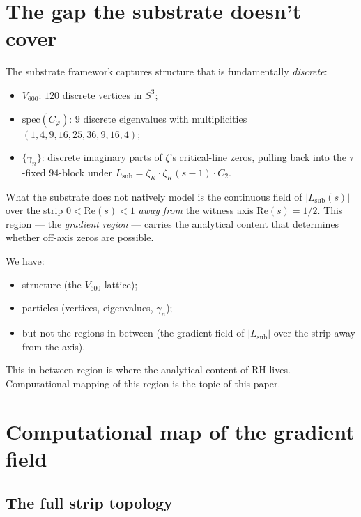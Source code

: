 \documentclass[11pt,a4paper]{article}
\newcommand{\Vsix}{V_{600}}
\newcommand{\Cphi}{C_\varphi}
\newcommand{\Lsub}{L_{\mathrm{sub}}}
\begin{document}
\tableofcontents
\newpage

\section{The gap the substrate doesn't cover}
\label{sec:gap}

The substrate framework captures structure that is fundamentally
\emph{discrete}:

\begin{itemize}[leftmargin=*]
  \item $\Vsix$: $120$ discrete vertices in $S^3$;
  \item $\mathrm{spec}(\Cphi)$: $9$ discrete eigenvalues with
        multiplicities $(1, 4, 9, 16, 25, 36, 9, 16, 4)$;
  \item $\{\gamma_n\}$: discrete imaginary parts of $\zeta$'s
        critical-line zeros, pulling back into the $\tau$-fixed
        $94$-block under $\Lsub = \zeta_K \cdot \zeta_K(s-1)
        \cdot C_2$.
\end{itemize}

What the substrate does not natively model is the continuous
field of $|\Lsub(s)|$ over the strip $0 < \mathrm{Re}(s) < 1$
\emph{away from} the witness axis $\mathrm{Re}(s) = 1/2$. This
region --- the \emph{gradient region} --- carries the analytical
content that determines whether off-axis zeros are possible.

\begin{observationbox}[title={The gap, restated}]
We have:
\begin{itemize}[leftmargin=*,nosep]
  \item structure (the $\Vsix$ lattice);
  \item particles (vertices, eigenvalues, $\gamma_n$);
  \item but not the regions in between (the gradient field of
        $|\Lsub|$ over the strip away from the axis).
\end{itemize}
This in-between region is where the analytical content of RH
lives. Computational mapping of this region is the topic of this
paper.
\end{observationbox}

\section{Computational map of the gradient field}
\label{sec:map}

\subsection{The full strip topology}
\end{document}
